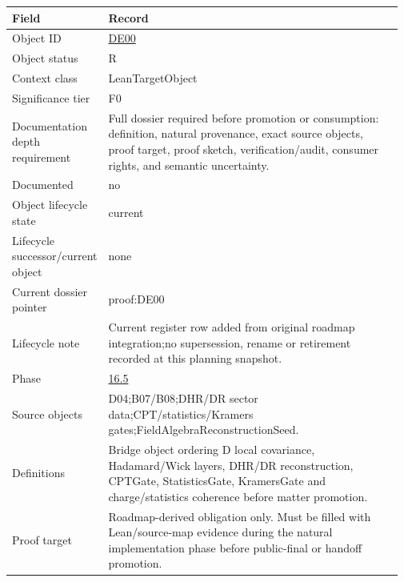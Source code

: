 \begin{longtable}{L{0.16\linewidth} L{0.81\linewidth}}
\hline
\textbf{Field} & \textbf{Record}\\
\hline
Object ID & \hyperlink{object-row-DE00}{DE00}\\
\hline\addlinespace[0.20em]
Object status & R\\
\hline\addlinespace[0.20em]
Context class & LeanTargetObject\\
\hline\addlinespace[0.20em]
Significance tier & F0\\
\hline\addlinespace[0.20em]
Documentation depth requirement & Full dossier required before promotion or consumption: definition, natural provenance, exact source objects, proof target, proof sketch, verification/\allowbreak{}audit, consumer rights, and semantic uncertainty.\\
\hline\addlinespace[0.20em]
Documented & no\\
\hline\addlinespace[0.20em]
Object lifecycle state & current\\
\hline\addlinespace[0.20em]
Lifecycle successor/\allowbreak{}current object & none\\
\hline\addlinespace[0.20em]
Current dossier pointer & proof:DE00\\
\hline\addlinespace[0.20em]
Lifecycle note & Current register row added from original roadmap integration;\newline no supersession, rename or retirement recorded at this planning snapshot.\\
\hline\addlinespace[0.20em]
Phase & \hyperlink{phase-row-16-5}{16.5}\\
\hline\addlinespace[0.20em]
Source objects & D04;\newline B07/\allowbreak{}B08;\newline DHR/\allowbreak{}DR sector data;\newline CPT/\allowbreak{}statistics/\allowbreak{}Kramers gates;\newline FieldAlgebraReconstructionSeed.\\
\hline\addlinespace[0.20em]
Definitions & Bridge object ordering D local covariance, Hadamard/\allowbreak{}Wick layers, DHR/\allowbreak{}DR reconstruction, CPTGate, StatisticsGate, KramersGate and charge/\allowbreak{}statistics coherence before matter promotion.\\
\hline\addlinespace[0.20em]
Proof target & Roadmap-derived obligation only. Must be filled with Lean/\allowbreak{}source-map evidence during the natural implementation phase before public-final or handoff promotion.\\

\end{longtable}
